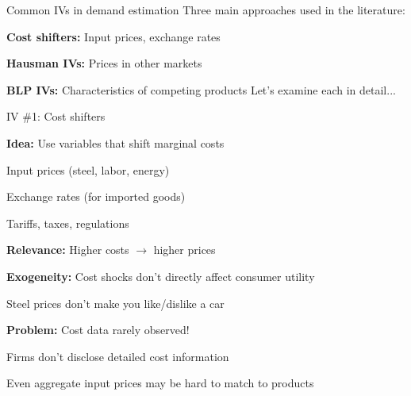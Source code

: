 \documentclass[notes,11pt, aspectratio=169]{beamer}
\newenvironment{wideitemize}{\itemize\addtolength{\itemsep}{10pt}}{\enditemize}
\newenvironment{wideenumerate}{\enumerate\addtolength{\itemsep}{10pt}}{\endenumerate}
\begin{document}
\begin{frame}{Common IVs in demand estimation}
	Three main approaches used in the literature:
	\begin{wideenumerate}
		\item \textbf{Cost shifters:} Input prices, exchange rates
		\item \textbf{Hausman IVs:} Prices in other markets
		\item \textbf{BLP IVs:} Characteristics of competing products
	\end{wideenumerate}
	\vspace{1em}
	Let's examine each in detail...
\end{frame}

\begin{frame}{IV \#1: Cost shifters}
	\begin{wideitemize}
		\item \textbf{Idea:} Use variables that shift marginal costs
		\begin{wideitemize}
			\vspace{3pt}
			\item Input prices (steel, labor, energy)
			\item Exchange rates (for imported goods)
			\item Tariffs, taxes, regulations
		\end{wideitemize} \pause
		\item \textbf{Relevance:} Higher costs $\rightarrow$ higher prices
		\item \textbf{Exogeneity:} Cost shocks don't directly affect consumer utility
		\begin{wideitemize}
			\vspace{3pt}
			\item Steel prices don't make you like/dislike a car
		\end{wideitemize} \pause
		\item \textbf{Problem:} Cost data rarely observed!
		\begin{wideitemize}
			\vspace{3pt}
			\item Firms don't disclose detailed cost information
			\item Even aggregate input prices may be hard to match to products
		\end{wideitemize}
	\end{wideitemize}
\end{frame}
\end{document}
